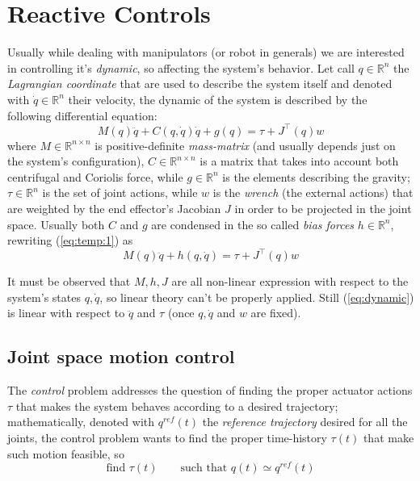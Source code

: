 \chapter{Reactive Controls}
	Usually while dealing with manipulators (or robot in generals) we are interested in controlling it's \textit{dynamic}, so affecting the system's behavior. Let call $q \in \mathds R^n$ the \textit{Lagrangian coordinate} that are used to describe the system itself and denoted with $\dot q \in \mathds R^n$ their velocity, the dynamic of the system is described by the following differential equation:
	\begin{equation} \label{eq:temp:1}
		M(q) \ddot q + C(q,\dot q) \dot q + g(q) = \tau + J^\top (q) w
	\end{equation}
	where $M\in \mathds R^{n\times n}$ is positive-definite \textit{mass-matrix} (and usually depends just on the system's configuration), $C \in \mathds R^{n\times n}$ is a matrix that takes into account both centrifugal and Coriolis force, while $g \in \mathds R^n$ is the elements describing the gravity; $\tau \in \mathds R^n$ is the set of joint actions, while $w$ is the \textit{wrench} (the external actions) that are weighted by the end effector's Jacobian $J$ in order to be projected in the joint space. Usually both $C$ and $g$ are condensed in the so called \textit{bias forces} $h \in \mathds R^n$, rewriting (\ref{eq:temp:1}) as
	\begin{equation} \label{eq:dynamic}
		M(q) \ddot q + h(q,\dot q) = \tau + J^\top(q) w
	\end{equation}

	It must be observed that $M, h, J$ are all non-linear expression with respect to the system's states $q,\dot q$, so linear theory can't be properly applied. Still (\ref{eq:dynamic}) is linear with respect to $\ddot q$ and $\tau$ (once $q,\dot q$ and $w$ are fixed).
	
\section{Joint space motion control}
	The \textit{control} problem addresses the question of finding the proper actuator actions $\tau$ that makes the system behaves according to a desired trajectory; mathematically, denoted with $q^{ref}(t)$ the \textit{reference trajectory} desired for all the joints, the control problem wants to find the proper time-history $\tau (t)$ that make such motion feasible, so
	\[ \textrm{find } \tau(t) \qquad \textrm{such that } q(t) \simeq q^{ref}(t) \]
	
